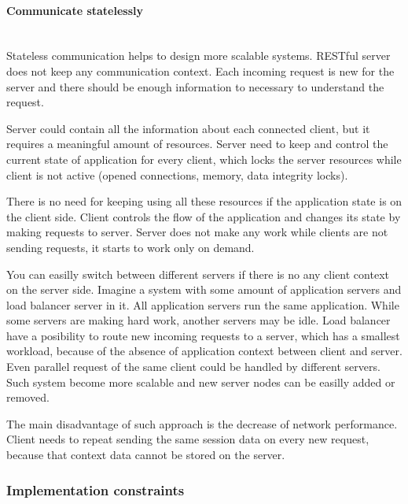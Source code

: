\paragraph{Communicate statelessly} ~\\

Stateless communication helps to design more scalable systems.
RESTful server does not  keep any communication context. Each incoming  request
is new for the server and there should be enough information to necessary to
understand the request\cite{Fielding2000}.

Server could contain all the information about each connected client, but it
requires a meaningful amount of resources. Server need to keep and control the
current state of application for every client, which locks the server resources
while client is not active (opened connections, memory, data integrity locks).

There is no need for keeping using all these resources if the application state
is on the client side. Client controls the flow of the application and
changes its state by making requests to server. Server does not make any work
while clients are not sending requests, it starts to work only on demand.

You can easilly switch between different servers if there is no any client
context on the server side. Imagine a system with some amount of application
servers and load balancer server in it. All application servers run the same
application. While some servers are making hard work, another servers may be
idle.
Load balancer have a posibility to route new incoming requests to a server,
which has a smallest workload, because of the absence of application context
between client and server. Even parallel request of the same client could be
handled by different servers. Such system become more scalable and new server
nodes can be easilly added or removed.

The main disadvantage of such approach is the decrease of network performance.
Client needs to repeat sending the same session data on every new request,
because that context data cannot be stored on the server. 


\subsubsection{Implementation constraints}


